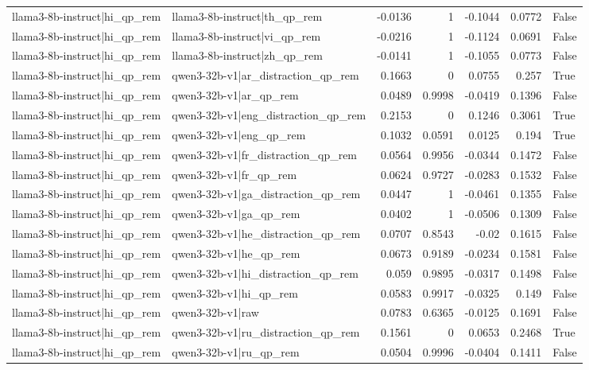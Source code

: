 \begin{table}
\begin{tabular}{l l r r r r l}
llama3-8b-instruct|hi_qp_rem & llama3-8b-instruct|th_qp_rem & -0.0136 & 1 & -0.1044 & 0.0772 & False \\
llama3-8b-instruct|hi_qp_rem & llama3-8b-instruct|vi_qp_rem & -0.0216 & 1 & -0.1124 & 0.0691 & False \\
llama3-8b-instruct|hi_qp_rem & llama3-8b-instruct|zh_qp_rem & -0.0141 & 1 & -0.1055 & 0.0773 & False \\
llama3-8b-instruct|hi_qp_rem & qwen3-32b-v1|ar_distraction_qp_rem & 0.1663 & 0 & 0.0755 & 0.257 & True \\
llama3-8b-instruct|hi_qp_rem & qwen3-32b-v1|ar_qp_rem & 0.0489 & 0.9998 & -0.0419 & 0.1396 & False \\
llama3-8b-instruct|hi_qp_rem & qwen3-32b-v1|eng_distraction_qp_rem & 0.2153 & 0 & 0.1246 & 0.3061 & True \\
llama3-8b-instruct|hi_qp_rem & qwen3-32b-v1|eng_qp_rem & 0.1032 & 0.0591 & 0.0125 & 0.194 & True \\
llama3-8b-instruct|hi_qp_rem & qwen3-32b-v1|fr_distraction_qp_rem & 0.0564 & 0.9956 & -0.0344 & 0.1472 & False \\
llama3-8b-instruct|hi_qp_rem & qwen3-32b-v1|fr_qp_rem & 0.0624 & 0.9727 & -0.0283 & 0.1532 & False \\
llama3-8b-instruct|hi_qp_rem & qwen3-32b-v1|ga_distraction_qp_rem & 0.0447 & 1 & -0.0461 & 0.1355 & False \\
llama3-8b-instruct|hi_qp_rem & qwen3-32b-v1|ga_qp_rem & 0.0402 & 1 & -0.0506 & 0.1309 & False \\
llama3-8b-instruct|hi_qp_rem & qwen3-32b-v1|he_distraction_qp_rem & 0.0707 & 0.8543 & -0.02 & 0.1615 & False \\
llama3-8b-instruct|hi_qp_rem & qwen3-32b-v1|he_qp_rem & 0.0673 & 0.9189 & -0.0234 & 0.1581 & False \\
llama3-8b-instruct|hi_qp_rem & qwen3-32b-v1|hi_distraction_qp_rem & 0.059 & 0.9895 & -0.0317 & 0.1498 & False \\
llama3-8b-instruct|hi_qp_rem & qwen3-32b-v1|hi_qp_rem & 0.0583 & 0.9917 & -0.0325 & 0.149 & False \\
llama3-8b-instruct|hi_qp_rem & qwen3-32b-v1|raw & 0.0783 & 0.6365 & -0.0125 & 0.1691 & False \\
llama3-8b-instruct|hi_qp_rem & qwen3-32b-v1|ru_distraction_qp_rem & 0.1561 & 0 & 0.0653 & 0.2468 & True \\
llama3-8b-instruct|hi_qp_rem & qwen3-32b-v1|ru_qp_rem & 0.0504 & 0.9996 & -0.0404 & 0.1411 & False \\

\end{tabular}
\end{table}
